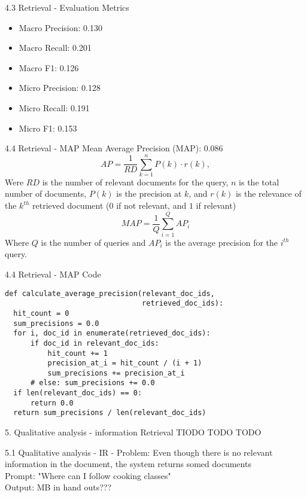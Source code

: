 \documentclass{beamer}
\begin{document}
\begin{frame}{4.3 Retrieval - Evaluation Metrics}
  \begin{itemize}
    \item Macro Precision: 0.130
    \item Macro Recall: 0.201
    \item Macro F1: 0.126
    \item Micro Precision: 0.128
    \item Micro Recall: 0.191
    \item Micro F1: 0.153
  \end{itemize}
\end{frame}

\begin{frame}{4.4 Retrieval - MAP}
  Mean Average Precision (MAP): 0.086
  \begin{equation}
    AP = \frac{1}{RD} \sum_{k=1}^{n} P(k) \cdot r(k),
  \end{equation}
  Were $RD$  is the number of relevant documents for the query, $n$ is the total number of documents, $P(k)$
  is the precision at $k$, and $r(k)$ is the relevance of the $k^{th}$ retrieved document ($0$ if not relevant, and $1$ if
  relevant)
  \begin{equation}
    MAP = \frac{1}{Q} \sum_{i=1}^{Q} AP_i
  \end{equation}
  Where $Q$ is the number of queries and $AP_i$ is the average precision for the $i^{th}$ query.
\end{frame}

\begin{frame}[fragile]{4.4 Retrieval - MAP Code}
  \begin{verbatim}
def calculate_average_precision(relevant_doc_ids,
                                retrieved_doc_ids):
  hit_count = 0
  sum_precisions = 0.0
  for i, doc_id in enumerate(retrieved_doc_ids):
      if doc_id in relevant_doc_ids:
          hit_count += 1
          precision_at_i = hit_count / (i + 1)
          sum_precisions += precision_at_i
      # else: sum_precisions += 0.0
  if len(relevant_doc_ids) == 0:
      return 0.0
  return sum_precisions / len(relevant_doc_ids)
  \end{verbatim}
\end{frame}

\begin{frame} {5. Qualitative analysis - information Retrieval}
  TIODO TODO TODO
\end{frame}

\begin{frame} {5.1 Qualitative analysis - IR - }
  Problem: Even though there is no relevant information in the document, the system returns somed documents\\
  Prompt: "Where can I follow cooking classes"\\
  Output: MB in hand outs???
\end{frame}
\end{document}
